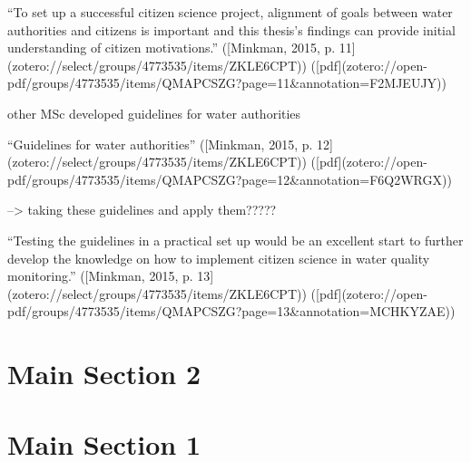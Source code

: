 “To set up a successful citizen science project, alignment of goals between water authorities and citizens is important and this thesis’s findings can provide initial understanding of citizen motivations.” ([Minkman, 2015, p. 11](zotero://select/groups/4773535/items/ZKLE6CPT)) ([pdf](zotero://open-pdf/groups/4773535/items/QMAPCSZG?page=11&annotation=F2MJEUJY))

other MSc developed guidelines for water authorities

“Guidelines for water authorities” ([Minkman, 2015, p. 12](zotero://select/groups/4773535/items/ZKLE6CPT)) ([pdf](zotero://open-pdf/groups/4773535/items/QMAPCSZG?page=12&annotation=F6Q2WRGX))

--> taking these guidelines and apply them?????

“Testing the guidelines in a practical set up would be an excellent start to further develop the knowledge on how to implement citizen science in water quality monitoring.” ([Minkman, 2015, p. 13](zotero://select/groups/4773535/items/ZKLE6CPT)) ([pdf](zotero://open-pdf/groups/4773535/items/QMAPCSZG?page=13&annotation=MCHKYZAE))
\section{Main Section 2}



\section{Main Section 1}